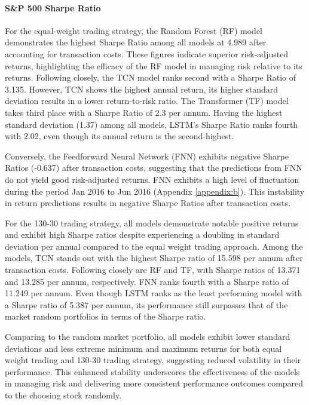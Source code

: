 \documentclass{article}
\begin{document}
\paragraph{S\&P 500 Sharpe Ratio}

For the equal-weight trading strategy, the Random Forest (RF) model demonstrates the highest Sharpe Ratio among all models at 4.989 after accounting for transaction costs. These figures indicate superior risk-adjusted returns, highlighting the efficacy of the RF model in managing risk relative to its returns. Following closely, the TCN model ranks second with a Sharpe Ratio of 3.135. However, TCN shows the highest annual return, its higher standard deviation results in a lower return-to-risk ratio. The Transformer (TF) model takes third place with a Sharpe Ratio of 2.3 per annum. Having the highest standard deviation (1.37) among all models, LSTM's Sharpe Ratio ranks fourth with 2.02, even though its annual return is the second-highest.

Conversely, the Feedforward Neural Network (FNN) exhibits negative Sharpe Ratios (-0.637) after transaction costs, suggesting that the predictions from FNN do not yield good risk-adjusted returns. FNN exhibits a high level of fluctuation during the period Jan 2016 to Jun 2016 (Appendix \ref{appendix:b}). This instability in return predictions results in negative Sharpe Ratios after transaction costs.

For the 130-30 trading strategy, all models demonstrate notable positive returns and exhibit high Sharpe ratios despite experiencing a doubling in standard deviation per annual compared to the equal weight trading approach. Among the models, TCN stands out with the highest Sharpe ratio of 15.598 per annum after transaction costs. Following closely are RF and TF, with Sharpe ratios of 13.371 and 13.285 per annum, respectively. FNN ranks fourth with a Sharpe ratio of 11.249 per annum. Even though LSTM ranks as the least performing model with a Sharpe ratio of 5.387 per annum, its performance still surpasses that of the market random portfolios in terms of the Sharpe ratio.

Comparing to the random market portfolio, all models exhibit lower standard deviations and less extreme minimum and maximum returns for both equal weight trading and 130-30 trading strategy, suggesting reduced volatility in their performance. This enhanced stability underscores the effectiveness of the models in managing risk and delivering more consistent performance outcomes compared to the choosing stock randomly.
\end{document}
